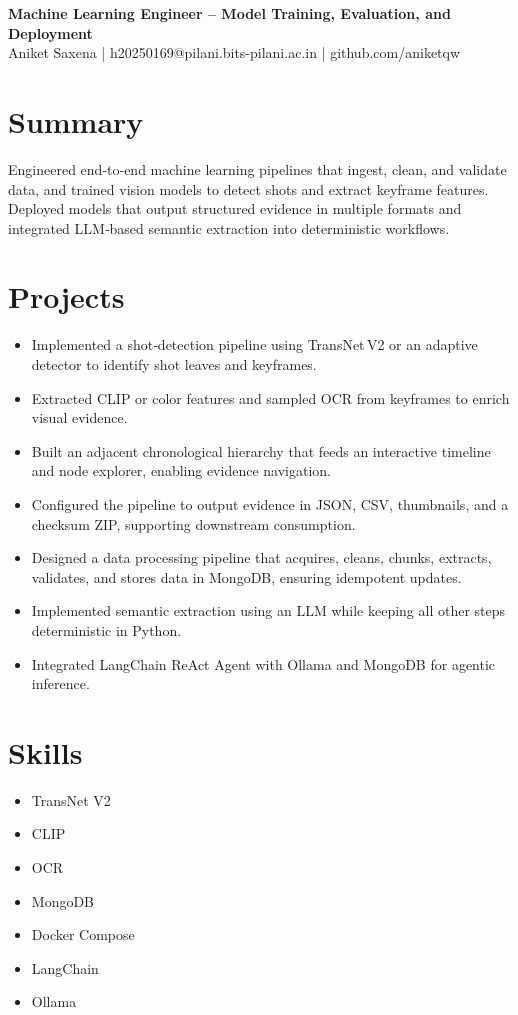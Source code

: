 \documentclass[11pt,a4paper]{article}
\begin{document}
\begin{center}{\LARGE\bfseries Machine Learning Engineer – Model Training, Evaluation, and Deployment}\\[4pt]
Aniket Saxena | h20250169@pilani.bits-pilani.ac.in | github.com/aniketqw\end{center}

\section*{Summary}
Engineered end‑to‑end machine learning pipelines that ingest, clean, and validate data, and trained vision models to detect shots and extract keyframe features. Deployed models that output structured evidence in multiple formats and integrated LLM‑based semantic extraction into deterministic workflows.

\section*{Projects}
\begin{itemize}
  \item Implemented a shot‑detection pipeline using TransNet V2 or an adaptive detector to identify shot leaves and keyframes.
  \item Extracted CLIP or color features and sampled OCR from keyframes to enrich visual evidence.
  \item Built an adjacent chronological hierarchy that feeds an interactive timeline and node explorer, enabling evidence navigation.
  \item Configured the pipeline to output evidence in JSON, CSV, thumbnails, and a checksum ZIP, supporting downstream consumption.
  \item Designed a data processing pipeline that acquires, cleans, chunks, extracts, validates, and stores data in MongoDB, ensuring idempotent updates.
  \item Implemented semantic extraction using an LLM while keeping all other steps deterministic in Python.
  \item Integrated LangChain ReAct Agent with Ollama and MongoDB for agentic inference.
\end{itemize}

\section*{Skills}
\begin{itemize}
  \item TransNet V2
  \item CLIP
  \item OCR
  \item MongoDB
  \item Docker Compose
  \item LangChain
  \item Ollama
\end{itemize}
\end{document}
